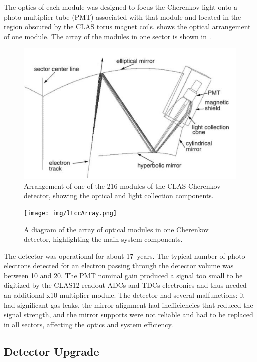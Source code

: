 The optics of each module was designed to focus the Cherenkov light onto a photo-multiplier tube (PMT) associated
with that module and located in the region obscured by the CLAS torus magnet coils.  shows
the optical arrangement of one module. The array of the modules in one sector is shown in .

\begin{figure}[ht]
	\centering
	\includegraphics[width=1.0\columnwidth,keepaspectratio]{img/optics.png}
	\caption{Arrangement of one of the 216 modules of the CLAS Cherenkov detector, showing the optical and
          light collection components.}
	\label{fig:optics}
\end{figure}

\begin{figure}[ht]
	\centering
	\texttt{[image: img/ltccArray.png]}
	\caption{A diagram of the array of optical modules in one Cherenkov detector, highlighting
          the main system components.}
	\label{fig:ltccArray}
\end{figure}

The detector was operational for about 17~years. The typical number of photo-electrons detected for an electron
passing through the detector volume was between 10 and 20. The PMT nominal gain produced a signal too small
to be digitized by the CLAS12 readout ADCs and TDCs electronics and thus needed an additional x10 multiplier module.
The detector had several malfunctions: it had significant gas leaks, the
mirror alignment had inefficiencies that reduced the signal strength, and the mirror supports were not reliable
and had to be replaced in all
sectors, affecting the optics and system efficiency.

\subsection{Detector Upgrade}

